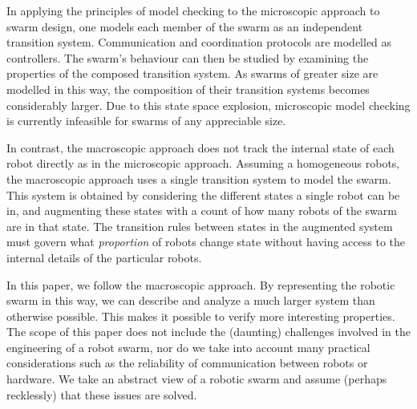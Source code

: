\documentclass[11pt]{article}
\theoremstyle{definition}
\begin{document}
In applying the principles of model checking to the microscopic approach to
swarm design, one models each member of the swarm as an independent transition
system.
Communication and coordination protocols are modelled as controllers.
The swarm's behaviour can then be studied by examining the properties of the
composed transition system.
As swarms of greater size are modelled in this way, the composition of their
transition systems becomes considerably larger.
Due to this state space explosion, microscopic model checking is currently
infeasible for swarms of any appreciable size.

%
In contrast, the macroscopic approach does not track the internal state of each
robot directly as in the microscopic approach.
Assuming a homogeneous robots, the macroscopic approach uses a single
transition system to model the swarm.
This system is obtained by considering the different states a single robot can
be in, and augmenting these states with a count of how many robots of the swarm
are in that state.
The transition rules between states in the augmented system must
govern what \emph{proportion} of robots change state without having access to
the internal details of the particular robots.

%
In this paper, we follow the macroscopic approach.
By representing the robotic swarm in this way, we can describe and analyze a
much larger system than otherwise possible.
This makes it possible to verify more interesting properties.
%
The scope of this paper does not include the (daunting) challenges involved in
the engineering of a robot swarm, nor do we take into account many practical
considerations such as the reliability of communication between robots or
hardware.
We take an abstract view of a robotic swarm and assume (perhaps recklessly)
that these issues are solved.
\end{document}

